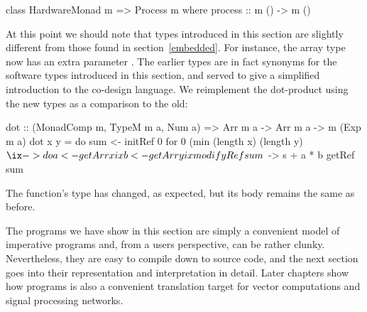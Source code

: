 \documentclass[../paper.tex]{subfiles}
\begin{document}
\begin{code}
class HardwareMonad m => Process m where
  process :: m () -> m ()
\end{code}

At this point we should note that types introduced in this section are slightly different from those found in section~\ref{embedded}. For instance, the array type now has an extra parameter . The earlier types are in fact synonyms for the software types introduced in this section, and served to give a simplified introduction to the co-design language. We reimplement the dot-product using the new types as a comparison to the old:

\begin{code}
dot :: (MonadComp m, TypeM m a, Num a) => Arr m a -> Arr m a -> m (Exp m a)
dot x y = do
  sum <- initRef 0
  for 0 (min (length x) (length y) $ \ix -> do
    a <- getArr x ix
    b <- getArr y ix
    modifyRef sum $ \s -> s + a * b
  getRef sum
\end{code}

\noindent The function's type has changed, as expected, but its body remains the same as before.

The programs we have show in this section are simply a convenient model of imperative programs and, from a users perspective, can be rather clunky. Nevertheless, they are easy to compile down to source code, and the next section goes into their representation and interpretation in detail. Later chapters show how programs is also a convenient translation target for vector computations and signal processing networks.



\end{document}
